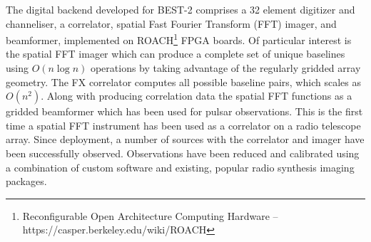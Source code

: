 \documentclass[useAMS,macros,usenatbib]{mn2e}
\begin{document}
The digital backend developed for BEST-2 comprises a 32 element digitizer and channeliser, a correlator, spatial Fast Fourier Transform (FFT) imager, and beamformer, implemented on ROACH\footnote{Reconfigurable Open Architecture Computing Hardware -- https://casper.berkeley.edu/wiki/ROACH} FPGA boards.
Of particular interest is the spatial FFT imager which can produce a complete set of unique baselines using $O(n \log n)$ operations by taking advantage of the regularly gridded array geometry.
The FX correlator computes all possible baseline pairs, which scales as $O(n^2)$.
Along with producing correlation data the spatial FFT functions as a gridded beamformer which has been used for pulsar observations.
This is the first time a spatial FFT instrument has been used as a correlator on a radio telescope array.
Since deployment, a number of sources with the correlator and imager have been successfully observed.
Observations have been reduced and calibrated using a combination of custom software and existing, popular radio synthesis imaging packages.
\end{document}
